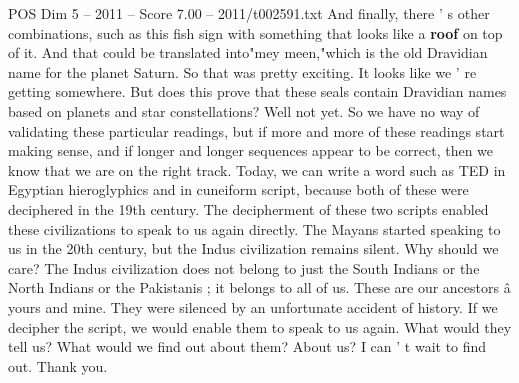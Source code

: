 \begin{textsample}{POS Dim 5 – 2011 – Score 7.00 – 2011/t002591.txt}
And finally, there ' s other combinations, such as this fish sign with something that looks like a \textbf{roof} on top of it.
And that could be translated into"mey meen,"which is the old Dravidian name for the planet Saturn.
So that was pretty exciting.
It looks like we ' re getting somewhere.
But does this prove that these seals contain Dravidian names based on planets and star constellations?
Well not yet.
So we have no way of validating these particular readings, but if more and more of these readings start making sense, and if longer and longer sequences appear to be correct, then we know that we are on the right track.
Today, we can write a word such as TED in Egyptian hieroglyphics and in cuneiform script, because both of these were deciphered in the 19th century.
The decipherment of these two scripts enabled these civilizations to speak to us again directly.
The Mayans started speaking to us in the 20th century, but the Indus civilization remains silent.
Why should we care?
The Indus civilization does not belong to just the South Indians or the North Indians or the Pakistanis ; it belongs to all of us.
These are our ancestors â yours and mine.
They were silenced by an unfortunate accident of history.
If we decipher the script, we would enable them to speak to us again.
What would they tell us?
What would we find out about them?
About us?
I can ' t wait to find out.
Thank you.

\end{textsample}

